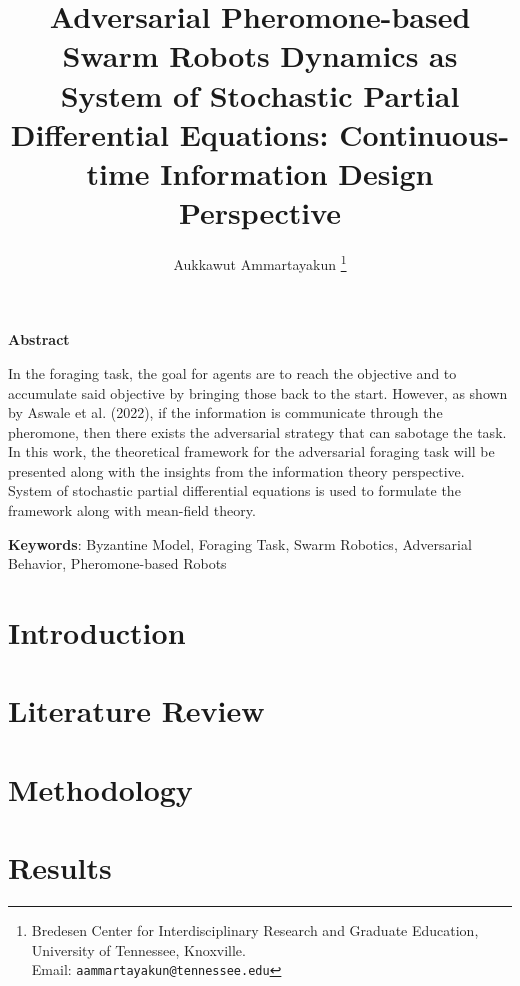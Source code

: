 \documentclass[12pt]{article}
\begin{document}
\title{Adversarial Pheromone-based Swarm Robots Dynamics as System of Stochastic Partial Differential Equations: Continuous-time Information Design Perspective}  

\author{
Aukkawut Ammartayakun   \thanks{Bredesen Center for Interdisciplinary Research and Graduate Education, University of Tennessee, Knoxville.  \\Email: {\tt aammartayakun@tennessee.edu}}  
}

\maketitle

\begin{center}
\textbf{Abstract}
\end{center}

In the foraging task, the goal for agents are to reach the objective and to accumulate said objective by bringing those back to the start. However, as shown by Aswale et al. (2022), if the information is communicate through the pheromone, then there exists the adversarial strategy that can sabotage the task. In this work, the theoretical framework for the adversarial foraging task will be presented along with the insights from the information theory perspective. System of stochastic partial differential equations is used to formulate the framework along with mean-field theory. 

\noindent
\textbf{Keywords}: Byzantine Model, Foraging Task, Swarm Robotics, Adversarial Behavior, Pheromone-based Robots

\thispagestyle{empty}

\newpage


\section{Introduction}\label{intro}

\section{Literature Review}
\section{Methodology}
\section{Results}
\end{document}
